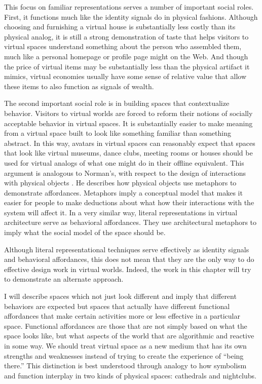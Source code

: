 This focus on familiar representations serves a number of important social roles. First, it functions much like the identity signals do in physical fashions. Although choosing and furnishing a virtual house is substantially less costly than its physical analog, it is still a strong demonstration of taste that helps visitors to virtual spaces understand something about the person who assembled them, much like a personal homepage or profile page might on the Web. And though the price of virtual items may be substantially less than the physical artifact it mimics, virtual economies usually have some sense of relative value that allow these items to also function as signals of wealth.

The second important social role is in building spaces that contextualize behavior. Visitors to virtual worlds are forced to reform their notions of socially acceptable behavior in virtual spaces. It is substantially easier to make meaning from a virtual space built to look like something familiar than something abstract. In this way, avatars in virtual spaces can reasonably expect that spaces that look like virtual museums, dance clubs, meeting rooms or houses should be used for virtual analogs of what one might do in their offline equivalent. This argument is analogous to Norman’s, with respect to the design of interactions with physical objects \citep{Norman:2002tv}. He describes how physical objects use metaphors to demonstrate affordances. Metaphors imply a conceptual model that makes it easier for people to make deductions about what how their interactions with the system will affect it. In a very similar way, literal representations in virtual architecture serve as behavioral affordances. They use architectural metaphors to imply what the social model of the space should be. 

Although literal representational techniques serve effectively as identity signals and behavioral affordances, this does not mean that they are the only way to do effective design work in virtual worlds. Indeed, the work in this chapter will try to demonstrate an alternate approach.

I will describe spaces which not just look different and imply that different behaviors are expected but spaces that actually have different functional affordances that make certain activities more or less effective in a particular space. Functional affordances are those that are not simply based on what the space looks like, but what aspects of the world that are algorithmic and reactive in some way. We should treat virtual space as a new medium that has its own strengths and weaknesses instead of trying to create the experience of ``being there.'' This distinction is best understood through analogy to how symbolism and function interplay in two kinds of physical spaces: cathedrals and nightclubs.

